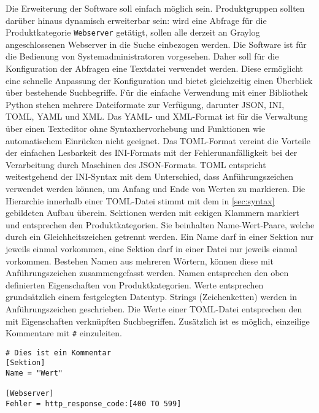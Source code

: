 Die Erweiterung der Software soll einfach möglich sein. Produktgruppen sollten darüber hinaus dynamisch erweiterbar sein: wird eine Abfrage für die Produktkategorie \lstinline{Webserver} getätigt, sollen alle derzeit an Graylog angeschlossenen Webserver in die Suche einbezogen werden. Die Software ist für die Bedienung von Systemadministratoren vorgesehen. Daher soll für die Konfiguration der Abfragen eine Textdatei verwendet werden. Diese ermöglicht eine schnelle Anpassung der Konfiguration und bietet gleichzeitig einen Überblick über bestehende Suchbegriffe. Für die einfache Verwendung mit einer Bibliothek Python stehen mehrere Dateiformate zur Verfügung, darunter JSON, INI, TOML, YAML und XML. Das YAML- und XML-Format ist für die Verwaltung über einen Texteditor ohne Syntaxhervorhebung und Funktionen wie automatischem Einrücken nicht geeignet. Das TOML-Format vereint die Vorteile der einfachen Lesbarkeit des INI-Formats mit der Fehlerunanfälligkeit bei der Verarbeitung durch Maschinen des JSON-Formats. TOML entspricht weitestgehend der INI-Syntax mit dem Unterschied, dass Anführungszeichen verwendet werden können, um Anfang und Ende von Werten zu markieren. Die Hierarchie innerhalb einer TOML-Datei stimmt mit dem in \autoref{sec:syntax} gebildeten Aufbau überein. Sektionen werden mit eckigen Klammern markiert und entsprechen den Produktkategorien. Sie beinhalten Name-Wert-Paare, welche durch ein Gleichheitszeichen getrennt werden. Ein Name darf in einer Sektion nur jeweils einmal vorkommen, eine Sektion darf in einer Datei nur jeweils einmal vorkommen. Bestehen Namen aus mehreren Wörtern, können diese mit Anführungszeichen zusammengefasst werden. Namen entsprechen den oben definierten Eigenschaften von Produktkategorien. Werte entsprechen grundsätzlich einem festgelegten Datentyp. Strings (Zeichenketten) werden in Anführungszeichen geschrieben. Die Werte einer TOML-Datei entsprechen den mit Eigenschaften verknüpften Suchbegriffen. Zusätzlich ist es möglich, einzeilige Kommentare mit \lstinline{#} einzuleiten.

\begin{lstlisting}[caption={Beispiel der TOML-Syntax.}, label=toml-syntax, xleftmargin=6mm]
# Dies ist ein Kommentar
[Sektion]
Name = "Wert"

[Webserver]
Fehler = http_response_code:[400 TO 599] 
\end{lstlisting}
